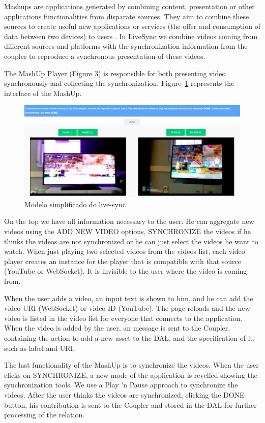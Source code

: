 Mashups are applications generated by combining content, presentation or other applications functionalities from disparate sources. They aim to combine these sources to create useful new applications or services (the offer and consumption of data between two devices) to users \cite{yu2008understanding}. In LiveSync we combine videos coming from different sources and platforms with the synchronization information from the coupler to reproduce a synchronous presentation of these videos.

The MashUp Player (Figure 3) is responsible for both presenting video synchronously and collecting the synchronization. Figure~\ref{screen1} represents the interface of the MashUp.

\begin{figure}
	\centerline{\includegraphics[scale=0.17] {figure/screen}}
	\caption{Modelo simplificado do live-sync}
	\label{screen1}
\end{figure}

On the top we have all information necessary to the user. He can aggregate new videos using the ADD NEW VIDEO options, SYNCHRONIZE the videos if he thinks the videos are not synchronized or he can just select the videos he want to watch. When just playing two selected videos from the videos list, each video player creates an instance for the player that is compatible with that source (YouTube or WebSocket). It is invisible to the user where the video is coming from.

When the user adds a video, an input text is shown to him, and he can add the video URI (WebSocket) or video ID (YouTube). The page reloads and the new video is listed in the video list for everyone that connects to the application. When the video is added by the user, an message is sent to the Coupler, containing the action to add a new asset to the DAL, and the specification of it, such as label and URI.

The last functionality of the MashUp is to synchronize the videos. When the user clicks on SYNCHRONIZE, a new mode of the application is revelled showing the synchronization tools. We use a Play 'n Pause approach to synchronize the videos. After the user thinks the videos are synchronized, clicking the DONE button, his contribution is sent to the Coupler and stored in the DAL for further processing of the relation.

